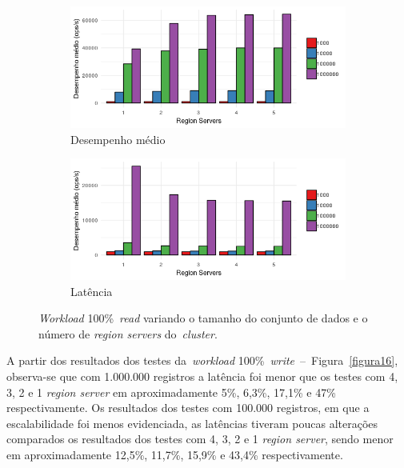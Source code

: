 \documentclass[12pt]{article}
\begin{document}
\begin{figure}[!ht]
    \centering
    \begin{subfigure}[b]{0.49\textwidth}
        \centering
        \includegraphics[width=\textwidth]{images/figura17}
        \caption{Desempenho médio}
        \label{figura17}
    \end{subfigure}
        \hfill
    \begin{subfigure}[b]{0.49\textwidth}  
        \centering 
        \includegraphics[width=\textwidth]{images/figura18}
        \caption{Latência}%
        \label{figura18}
    \end{subfigure}
    \caption{\emph{Workload} 100\%~\emph{read} variando o tamanho do conjunto de dados e o número de \emph{region servers} do~\emph{cluster}.}
\end{figure}

A partir dos resultados dos testes da~\emph{workload} 100\%~\emph{write}~--~Figura~\ref{figura16}, observa-se que com 1.000.000 registros a latência foi menor que os testes com 4, 3, 2 e 1 \emph{region server} em aproximadamente 5\%, 6,3\%, 17,1\% e 47\% respectivamente. 
Os resultados dos testes com 100.000 registros, em que a escalabilidade foi menos evidenciada, as latências tiveram poucas alterações comparados os resultados dos testes com 4, 3, 2 e 1 \emph{region server}, sendo menor em aproximadamente 12,5\%, 11,7\%, 15,9\% e 43,4\% respectivamente.
\end{document}
